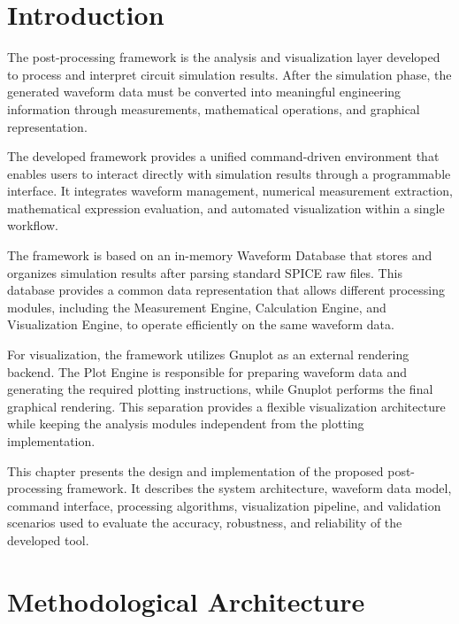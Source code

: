 \label{chap:Post-Processing}
\section{Introduction}
\label{sec:pp-introduction}
The post-processing framework is the analysis and visualization layer developed to process and interpret circuit simulation results. After the simulation phase, the generated waveform data must be converted into meaningful engineering information through measurements, mathematical operations, and graphical representation.

The developed framework provides a unified command-driven environment that enables users to interact directly with simulation results through a programmable interface. It integrates waveform management, numerical measurement extraction, mathematical expression evaluation, and automated visualization within a single workflow.

The framework is based on an in-memory Waveform Database that stores and organizes simulation results after parsing standard SPICE raw files. This database provides a common data representation that allows different processing modules, including the Measurement Engine, Calculation Engine, and Visualization Engine, to operate efficiently on the same waveform data.

For visualization, the framework utilizes Gnuplot as an external rendering backend. The Plot Engine is responsible for preparing waveform data and generating the required plotting instructions, while Gnuplot performs the final graphical rendering. This separation provides a flexible visualization architecture while keeping the analysis modules independent from the plotting implementation.

This chapter presents the design and implementation of the proposed post-processing framework. It describes the system architecture, waveform data model, command interface, processing algorithms, visualization pipeline, and validation scenarios used to evaluate the accuracy, robustness, and reliability of the developed tool.
\newpage

\section{Methodological Architecture}
\label{sec:pp-architecture}

